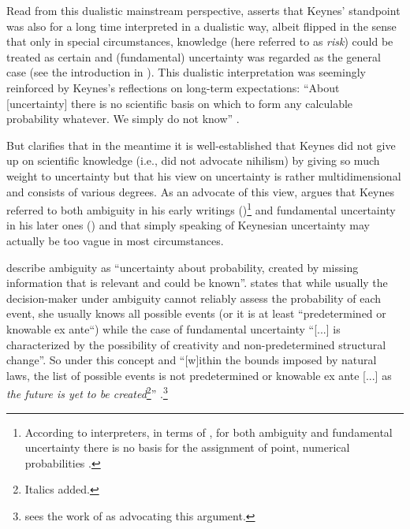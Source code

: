 \documentclass[a4paper,11pt,listof=nochaptergap,oneside,pointednumbers,bibtotoc,bigheadings,liststotoc,hidelinks]{scrbook}
\theoremstyle{mysatz}
\theoremstyle{mydefinition}
\theoremstyle{mytheorem}
\theoremstyle{mybemerkung}
\begin{document}
Read from this dualistic mainstream perspective, \citet{dow:16} asserts that Keynes' standpoint was also for a long time interpreted in a dualistic way, albeit flipped in the sense that only in special circumstances, knowledge (here referred to as \textit{risk}) could be treated as certain and (fundamental) uncertainty was regarded as the general case (see the introduction in \citealp{keynes:21}). This dualistic interpretation was seemingly reinforced by Keynes's reflections on long-term expectations: ``About [uncertainty] there is no scientific basis on which to form any calculable probability whatever. We simply do not know'' \citep[p. 214/214]{keynes:37}.

But \citet{dow:16} clarifies that in the meantime it is well-established that Keynes did not give up on scientific knowledge (i.e., did not advocate nihilism) by giving so much weight to uncertainty but that his view on uncertainty is rather multidimensional and consists of various degrees. As an advocate of this view, \citet{dequesh:00} argues that Keynes referred to both ambiguity in his early writings (\citealp{keynes:21})\footnote{According to interpreters, in terms of \citet{keynes:21}, for both ambiguity and fundamental uncertainty there is no basis for the assignment of point, numerical probabilities \citep{dequesh:00}.} and fundamental uncertainty in his later ones (\citealp{keynes:37}) and that simply speaking of Keynesian uncertainty may actually be too vague in most circumstances.

\citet[p. 330]{camererandweber:92} describe ambiguity as ``uncertainty about probability, created by missing information that is relevant and could be known''. \citet[p. 623]{dequech:14} states that while usually the decision-maker under ambiguity cannot reliably assess the probability of each event, she usually knows all possible events (or it is at least ``predetermined or knowable ex ante``) while the case of fundamental uncertainty ``[...] is characterized by the possibility of creativity and non-predetermined structural change''. So under this concept and ``[w]ithin the bounds imposed by natural laws, the list of possible events is not predetermined or knowable ex ante [...] as \textit{the future is yet to be created}\footnote{Italics added.}'' \citep[p. 623]{dequech:14}.\footnote{\citet{dequesh:00} sees the work of \citet{shackle:72} as advocating this argument.}
\end{document}

